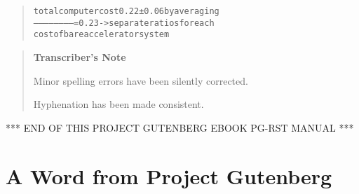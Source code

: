 \documentclass[a5paper]{book}
\begin{document}
\begin{german}
\begin{table}[htbp]
\begin{center}
\begin{longtable}{lll}
\setlength{\dimen0}{0.200\tablewidth}\setbox0\vbox{\hsize\dimen0\parbox[t]{\dimen0}{\raggedleft\setlength{\parskip}{1em}\noindent{}\@arstrut}}\box0\tabularnewline
\bottomrule
\end{longtable}
\end{center}
\end{table}

\begin{quote}
\begin{alltt}
{\footnotesize{total computer cost                   0.22 ± 0.06 by averaging
------------------------  =  0.23 ->  separate ratios for each
cost of bare accelerator              system
}}
\end{alltt}
\end{quote}

%
\backmatter
%


\par

\begin{quotation}
\textbf{{\noindent}Transcriber’s Note}\par

\vspace{1em}


Minor spelling errors have been silently corrected.\par

Hyphenation has been made consistent.\par
\end{quotation}

\vspace{5em}
\label{pg-end-line}%
\hypertarget{pg-end-line}{}%
{}

*** END OF THIS PROJECT GUTENBERG EBOOK PG-RST MANUAL ***\par

%
\backmatter
%

{}

\begin{english}
\begin{pgfooter_env}
\cleardoublepage
\label{a-word-from-project-gutenberg}%
\hypertarget{a-word-from-project-gutenberg}{}%
\label{pg-footer}%
\hypertarget{pg-footer}{}%
%
\chapter*{A Word from Project Gutenberg}



\end{pgfooter_env}
\end{english}
\end{german}
\end{document}
